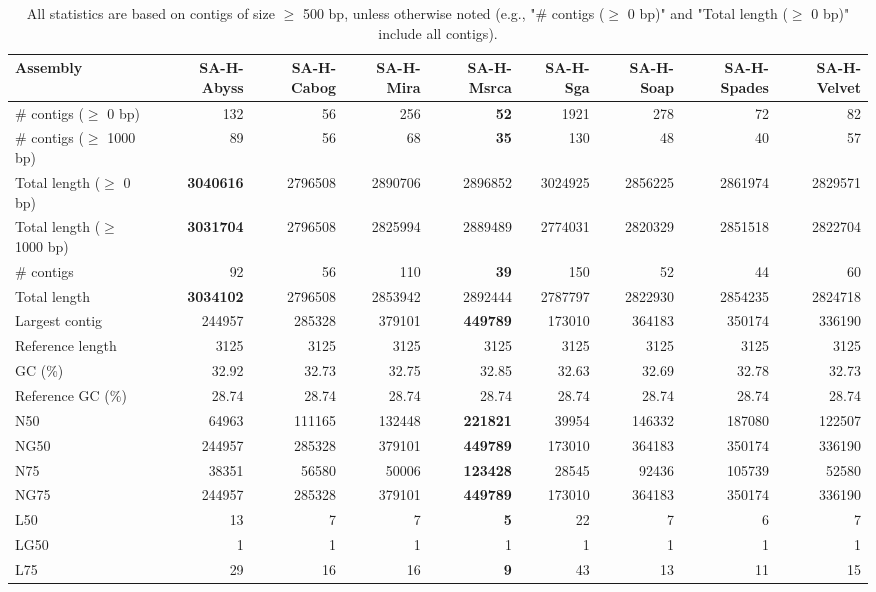 \documentclass[12pt,a4paper]{article}
\begin{document}
\begin{table}[ht]
\begin{center}
\caption{All statistics are based on contigs of size $\geq$ 500 bp, unless otherwise noted (e.g., "\# contigs ($\geq$ 0 bp)" and "Total length ($\geq$ 0 bp)" include all contigs).}
\begin{tabular}{|l*{8}{|r}|}
\hline
Assembly & SA-H-Abyss & SA-H-Cabog & SA-H-Mira & SA-H-Msrca & SA-H-Sga & SA-H-Soap & SA-H-Spades & SA-H-Velvet \\ \hline
\# contigs ($\geq$ 0 bp) & 132 & 56 & 256 & {\bf 52} & 1921 & 278 & 72 & 82 \\ \hline
\# contigs ($\geq$ 1000 bp) & 89 & 56 & 68 & {\bf 35} & 130 & 48 & 40 & 57 \\ \hline
Total length ($\geq$ 0 bp) & {\bf 3040616} & 2796508 & 2890706 & 2896852 & 3024925 & 2856225 & 2861974 & 2829571 \\ \hline
Total length ($\geq$ 1000 bp) & {\bf 3031704} & 2796508 & 2825994 & 2889489 & 2774031 & 2820329 & 2851518 & 2822704 \\ \hline
\# contigs & 92 & 56 & 110 & {\bf 39} & 150 & 52 & 44 & 60 \\ \hline
Total length & {\bf 3034102} & 2796508 & 2853942 & 2892444 & 2787797 & 2822930 & 2854235 & 2824718 \\ \hline
Largest contig & 244957 & 285328 & 379101 & {\bf 449789} & 173010 & 364183 & 350174 & 336190 \\ \hline
Reference length & 3125 & 3125 & 3125 & 3125 & 3125 & 3125 & 3125 & 3125 \\ \hline
GC (\%) & 32.92 & 32.73 & 32.75 & 32.85 & 32.63 & 32.69 & 32.78 & 32.73 \\ \hline
Reference GC (\%) & 28.74 & 28.74 & 28.74 & 28.74 & 28.74 & 28.74 & 28.74 & 28.74 \\ \hline
N50 & 64963 & 111165 & 132448 & {\bf 221821} & 39954 & 146332 & 187080 & 122507 \\ \hline
NG50 & 244957 & 285328 & 379101 & {\bf 449789} & 173010 & 364183 & 350174 & 336190 \\ \hline
N75 & 38351 & 56580 & 50006 & {\bf 123428} & 28545 & 92436 & 105739 & 52580 \\ \hline
NG75 & 244957 & 285328 & 379101 & {\bf 449789} & 173010 & 364183 & 350174 & 336190 \\ \hline
L50 & 13 & 7 & 7 & {\bf 5} & 22 & 7 & 6 & 7 \\ \hline
LG50 & 1 & 1 & 1 & 1 & 1 & 1 & 1 & 1 \\ \hline
L75 & 29 & 16 & 16 & {\bf 9} & 43 & 13 & 11 & 15 \\ \hline

\end{tabular}
\end{center}
\end{table}
\end{document}
